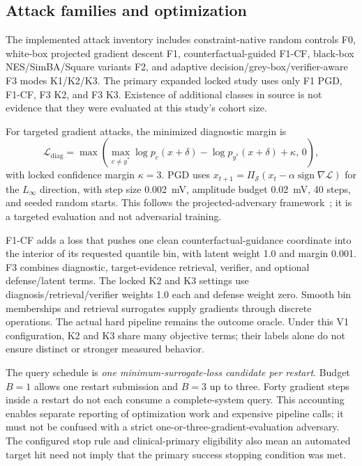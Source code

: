 \subsection{Attack families and optimization}
The implemented attack inventory includes constraint-native random controls F0, white-box projected gradient descent F1, counterfactual-guided F1-CF, black-box NES/SimBA/Square variants F2, and adaptive decision/grey-box/verifier-aware F3 modes K1/K2/K3. The primary expanded locked study uses only F1 PGD, F1-CF, F3 K2, and F3 K3. Existence of additional classes in source is not evidence that they were evaluated at this study's cohort size.

For targeted gradient attacks, the minimized diagnostic margin is
\begin{equation}
\mathcal{L}_{\mathrm{diag}}=\max\left(\max_{c\ne y^*}\log p_c(x+\delta)-\log p_{y^*}(x+\delta)+\kappa,\,0\right),
\end{equation}
with locked confidence margin $\kappa=3$. PGD uses $x_{t+1}=\Pi_{\mathcal S}(x_t-\alpha\operatorname{sign}\nabla\mathcal L)$ for the $L_\infty$ direction, with step size 0.002~mV, amplitude budget 0.02~mV, 40 steps, and seeded random starts. This follows the projected-adversary framework~\cite{pgd}; it is a targeted evaluation and not adversarial training.

F1-CF adds a loss that pushes one clean counterfactual-guidance coordinate into the interior of its requested quantile bin, with latent weight 1.0 and margin 0.001. F3 combines diagnostic, target-evidence retrieval, verifier, and optional defense/latent terms. The locked K2 and K3 settings use diagnosis/retrieval/verifier weights 1.0 each and defense weight zero. Smooth bin memberships and retrieval surrogates supply gradients through discrete operations. The actual hard pipeline remains the outcome oracle. Under this V1 configuration, K2 and K3 share many objective terms; their labels alone do not ensure distinct or stronger measured behavior.

The query schedule is \emph{one minimum-surrogate-loss candidate per restart}. Budget $B=1$ allows one restart submission and $B=3$ up to three. Forty gradient steps inside a restart do not each consume a complete-system query. This accounting enables separate reporting of optimization work and expensive pipeline calls; it must not be confused with a strict one-or-three-gradient-evaluation adversary. The configured stop rule and clinical-primary eligibility also mean an automated target hit need not imply that the primary success stopping condition was met.


